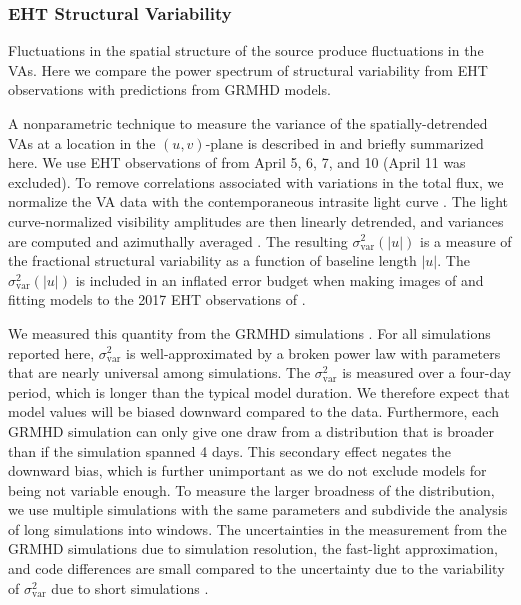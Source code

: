 \subsubsection{EHT Structural Variability}

Fluctuations in the spatial structure of the source produce fluctuations in the VAs.
Here we compare  the power spectrum of structural variability from EHT observations with predictions from GRMHD models.

A nonparametric technique to measure the variance of the spatially-detrended VAs at a location in the $(u,v)$-plane is described in \citet{NoiseModeling} and briefly summarized here.
We use EHT observations of \sgra from April 5, 6, 7, and 10 (April 11 was excluded).
To remove correlations associated with variations in the total flux, we normalize the VA data with the contemporaneous intrasite light curve \citep{Georgiev_2022}.
The light curve-normalized visibility amplitudes are then linearly detrended, and variances are computed and azimuthally averaged \citep{NoiseModeling}.
The resulting $\sigma_\text{var}^2 (|u|)$ is a measure of the fractional structural variability as a function of baseline length $|u|$.
The $\sigma_\text{var}^2 (|u|)$ is included in an inflated error budget when making images of and fitting models to the 2017 EHT observations of \sgra {}.

We measured this quantity from the GRMHD simulations \citep[see][for details]{Georgiev_2022}.
For all simulations reported here, $\sigma_\text{var}^2$ is well-approximated by a broken power law with parameters that are nearly universal among simulations.
The $\sigma_\text{var}^2$ is measured over a four-day period, which is longer than the typical model duration.
We therefore expect that model values will be biased downward compared to the data. Furthermore, each GRMHD simulation can only give one draw from a distribution that is broader than if the simulation spanned 4 days. This secondary effect negates the downward bias, which is further unimportant as we do not exclude models for being not variable enough. To measure the larger broadness of the distribution, we use multiple simulations with the same parameters and subdivide the analysis of long simulations into windows.
The uncertainties in the measurement from the GRMHD simulations due to simulation resolution, the fast-light approximation, and code differences are small compared to the uncertainty due to the variability of $\sigma_\text{var}^2$ due to short simulations \citep{Georgiev_2022}.

